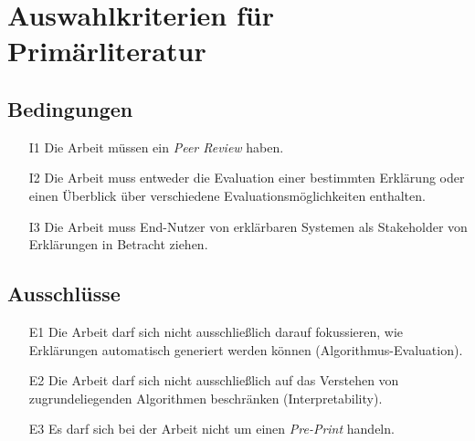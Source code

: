 \section{Auswahlkriterien für Primärliteratur}

\subsection*{Bedingungen}

\begin{enumerate}
    \item[I1] Die Arbeit müssen ein \textit{Peer Review} haben.
    \item[I2] Die Arbeit muss entweder die Evaluation einer bestimmten Erklärung oder einen Überblick über verschiedene Evaluationsmöglichkeiten enthalten.
    \item[I3] Die Arbeit muss End-Nutzer von erklärbaren Systemen als Stakeholder von Erklärungen in Betracht ziehen.
\end{enumerate}

\subsection*{Ausschlüsse}

\begin{enumerate}
    \item[E1] Die Arbeit darf sich nicht ausschließlich darauf fokussieren, wie Erklärungen automatisch generiert werden können (Algorithmus-Evaluation).
    \item[E2] Die Arbeit darf sich nicht ausschließlich auf das Verstehen von zugrundeliegenden Algorithmen beschränken (Interpretability).
    \item[E3] Es darf sich bei der Arbeit nicht um einen \textit{Pre-Print} handeln. 
\end{enumerate}
